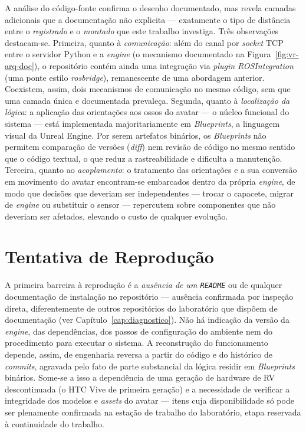 A análise do código-fonte confirma o desenho documentado, mas revela camadas adicionais que
a documentação não explicita --- exatamente o tipo de distância entre o \emph{registrado} e o
\emph{montado} que este trabalho investiga. Três observações destacam-se. Primeira, quanto à
\emph{comunicação}: além do canal por \emph{socket} TCP entre o servidor Python e a
\emph{engine} (o mecanismo documentado na Figura~\ref{fig:vr-arq-doc}), o repositório contém
ainda uma integração via \emph{plugin} \emph{ROSIntegration} (uma ponte estilo
\emph{rosbridge}), remanescente de uma abordagem anterior. Coexistem, assim, dois mecanismos
de comunicação no mesmo código, sem que uma camada única e documentada prevaleça. Segunda,
quanto à \emph{localização da lógica}: a aplicação das orientações aos ossos do avatar ---
o núcleo funcional do sistema --- está implementada majoritariamente em \emph{Blueprints}, a
linguagem visual da Unreal Engine. Por serem artefatos binários, os \emph{Blueprints} não
permitem comparação de versões (\emph{diff}) nem revisão de código no mesmo sentido que o
código textual, o que reduz a rastreabilidade e dificulta a manutenção. Terceira, quanto ao
\emph{acoplamento}: o tratamento das orientações e a sua conversão em movimento do avatar
encontram-se embarcados dentro da própria \emph{engine}, de modo que decisões que deveriam
ser independentes --- trocar o capacete, migrar de \emph{engine} ou substituir o sensor ---
repercutem sobre componentes que não deveriam ser afetados, elevando o custo de qualquer
evolução.

\section{Tentativa de Reprodução}
\label{sec:vr-reproducao}

A primeira barreira à reprodução é a \emph{ausência de um \texttt{README}} ou de qualquer
documentação de instalação no repositório --- ausência confirmada por inspeção direta,
diferentemente de outros repositórios do laboratório que dispõem de documentação (ver
Capítulo~\ref{cap:diagnostico}). Não há indicação da versão da \emph{engine}, das
dependências, dos passos de configuração do ambiente nem do procedimento para executar o
sistema. A reconstrução do funcionamento depende, assim, de engenharia reversa a partir do
código e do histórico de \emph{commits}, agravada pelo fato de parte substancial da lógica
residir em \emph{Blueprints} binários. Some-se a isso a dependência de uma geração de
hardware de RV descontinuada (o HTC Vive de primeira geração) e a necessidade de verificar a
integridade dos modelos e \emph{assets} do avatar --- itens cuja disponibilidade só pode ser
plenamente confirmada na estação de trabalho do laboratório, etapa reservada à continuidade
do trabalho.

